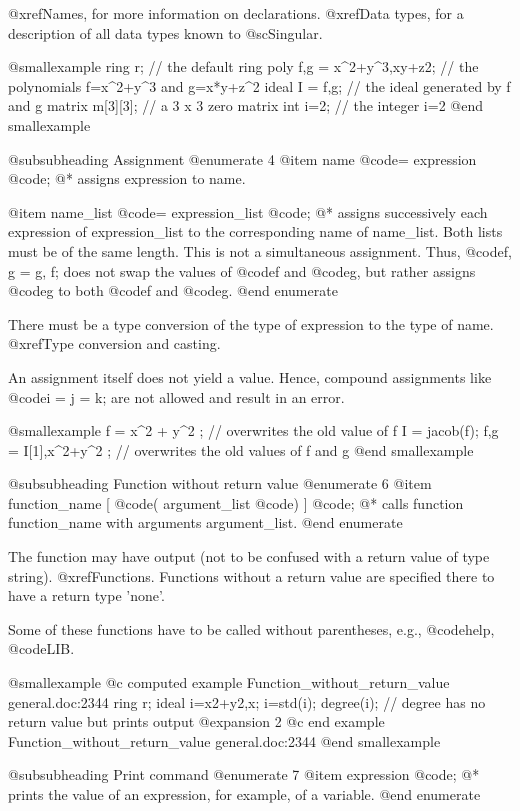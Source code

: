 @xref{Names}, for more information on declarations.  @xref{Data types},
for a description of all data types known to @sc{Singular}.

@smallexample
ring r;                   // the default ring
poly f,g = x^2+y^3,xy+z2; // the polynomials f=x^2+y^3 and g=x*y+z^2
ideal I = f,g;            // the ideal generated by f and g
matrix m[3][3];           // a 3 x 3 zero matrix
int i=2;                  // the integer i=2
@end smallexample

@subsubheading Assignment
@enumerate 4
@item
name @code{=} expression @code{;}
@* assigns expression to name.

@item
name_list @code{=} expression_list @code{;}
@* assigns successively each expression of expression_list to the
corresponding name of name_list. Both lists must be of the same
length.  This is not a simultaneous assignment.  Thus, @code{f, g = g, f;} does
not swap the values of @code{f} and @code{g}, but rather assigns
@code{g} to both @code{f} and @code{g}.
@end enumerate

There must be a type conversion of the type of expression to the type of
name. @xref{Type conversion and casting}.

An assignment itself does not yield a value. Hence, compound assignments
like @code{i = j = k;} are not allowed and result in an error.

@smallexample
f = x^2 + y^2 ;      // overwrites the old value of f
I = jacob(f);
f,g = I[1],x^2+y^2 ; // overwrites the old values of f and g
@end smallexample

@subsubheading Function without return value
@enumerate 6
@item
function_name [ @code{(} argument_list @code{)} ] @code{;}
@* calls function function_name with arguments argument_list.
@end enumerate

The function may have output (not to be confused with a return value of
type string). @xref{Functions}. Functions without a return value are
specified there to have a return type 'none'.

Some of these functions have to be called without parentheses, e.g.,
@code{help}, @code{LIB}.

@smallexample
@c computed example Function_without_return_value general.doc:2344 
  ring r;
  ideal i=x2+y2,x;
  i=std(i);
  degree(i);        // degree has no return value but prints output
@expansion{} 2
@c end example Function_without_return_value general.doc:2344
@end smallexample

@subsubheading Print command
@enumerate 7
@item
expression @code{;}
@* prints the value of an expression, for example, of a variable.
@end enumerate


